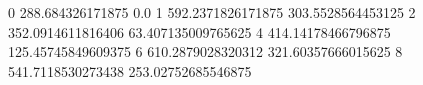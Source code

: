 0 288.684326171875 0.0
1 592.2371826171875 303.5528564453125
2 352.0914611816406 63.407135009765625
4 414.14178466796875 125.45745849609375
6 610.2879028320312 321.60357666015625
8 541.7118530273438 253.02752685546875
